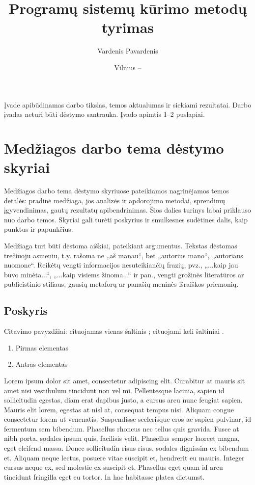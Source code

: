 \documentclass{VUMIFPSkursinis}
\title{Programų sistemų kūrimo metodų tyrimas}
\author{Vardenis Pavardenis}
\date{Vilnius – \the\year}
\begin{document}
	
\maketitle
\cleardoublepage{}
\setcounter{page}{2}

\tableofcontents

Įvade apibūdinamas darbo tikslas, temos aktualumas ir siekiami rezultatai.
Darbo įvadas neturi būti dėstymo santrauka. Įvado apimtis 1–2 puslapiai.

\section{Medžiagos darbo tema dėstymo skyriai}
Medžiagos darbo tema dėstymo skyriuose pateikiamos nagrinėjamos temos detalės:
pradinė medžiaga, jos analizės ir apdorojimo metodai, sprendimų įgyvendinimas,
gautų rezultatų apibendrinimas. Šios dalies turinys labai priklauso nuo darbo
temos. Skyriai gali turėti poskyrius ir smulkesnes sudėtines dalis, kaip
punktus ir papunkčius.

Medžiaga turi būti dėstoma aiškiai, pateikiant argumentus. Tekstas dėstomas
trečiuoju asmeniu, t.y. rašoma ne „aš manau“, bet „autorius mano“, „autoriaus
nuomone“. Reikėtų vengti informacijos nesuteikiančių frazių, pvz., „...kaip jau
buvo minėta...“, „...kaip visiems žinoma...“ ir pan., vengti grožinės literatūros
ar publicistinio stiliaus, gausių metaforų ar panašių meninės išraiškos
priemonių.

\subsection{Poskyris}
Citavimo pavyzdžiai: cituojamas vienas šaltinis \cite{PvzStraipsnLt}; cituojami
keli šaltiniai \cite{PvzStraipsnEn, PvzKonfLt, PvzKonfEn, PvzKnygLt, PvzKnygEn,
PvzElPubLt, PvzElPubEn, PvzMagistrLt, PvzPhdEn}.

\begin{enumerate}
	\item Pirmas elementas
	\item Antras elementas
\end{enumerate}

Lorem ipsum dolor sit amet, consectetur adipiscing elit. Curabitur at mauris sit amet nisi vestibulum tincidunt non vel mi. Pellentesque lacinia, sapien id sollicitudin egestas, diam erat dapibus justo, a cursus arcu nunc feugiat sapien. Mauris elit lorem, egestas at nisl at, consequat tempus nisi. Aliquam congue consectetur lorem ut venenatis. Suspendisse scelerisque eros ac sapien pulvinar, id fermentum sem bibendum. Phasellus rhoncus nec tellus quis gravida. Fusce at nibh porta, sodales ipsum quis, facilisis velit. Phasellus semper laoreet magna, eget eleifend massa. Donec sollicitudin risus risus, sodales dignissim ex bibendum et. Aliquam neque lectus, posuere vitae suscipit et, hendrerit eu mauris. Integer cursus neque ex, sed molestie ex suscipit et. Phasellus eget quam id arcu tincidunt fringilla eget eu tortor. In hac habitasse platea dictumst.
\end{document}
